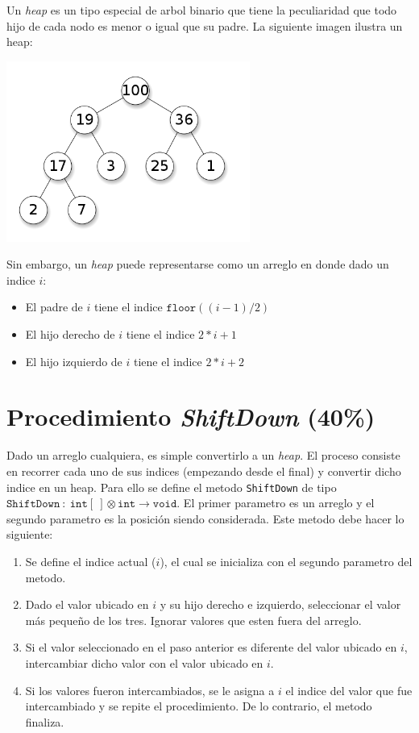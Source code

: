 \documentclass{article}
\begin{document}
Un \emph{heap} es un tipo especial de arbol binario que tiene la peculiaridad que todo hijo
de cada nodo es menor o igual que su padre. La siguiente imagen ilustra un heap:
\\
\begin{center}
        \includegraphics[width=8cm]{./heap.png}
\end{center}
Sin embargo, un \emph{heap} puede representarse como un arreglo en donde dado un indice $i$:
\begin{itemize}
        \item{El padre de $i$ tiene el indice $\mathtt{floor}((i-1)/2)$}
        \item{El hijo derecho de $i$ tiene el indice $2*i+1$}
        \item{El hijo izquierdo de $i$ tiene el indice $2*i+2$}
\end{itemize}

\section*{Procedimiento \emph{ShiftDown} (40\%)}
Dado un arreglo cualquiera, es simple convertirlo a un \emph{heap}. El proceso consiste
en recorrer cada uno de sus indices (empezando desde el final) y convertir dicho indice
en un heap. Para ello se define el metodo \texttt{ShiftDown}\cite{HeapSort} de tipo $\mathtt{ShiftDown}\ :
\ \mathtt{int}[\ ]\otimes\mathtt{int}\rightarrow\mathtt{void}$. El primer parametro es un
arreglo y el segundo parametro es la posici\'on siendo considerada. Este metodo debe hacer
lo siguiente:
\begin{enumerate}
        \item{Se define el indice actual ($i$), el cual se inicializa con el segundo parametro del metodo.}
        \item{Dado el valor ubicado en $i$ y su hijo derecho e izquierdo, seleccionar el valor m\'as peque\~no
        de los tres. Ignorar valores que esten fuera del arreglo. }
        \item{Si el valor seleccionado en el paso anterior es diferente del valor ubicado en $i$,
        intercambiar dicho valor con el valor ubicado en $i$.}
        \item{Si los valores fueron intercambiados, se le asigna a $i$ el indice del valor que fue
        intercambiado y se repite el procedimiento. De lo contrario, el metodo finaliza.}
\end{enumerate}
\end{document}
